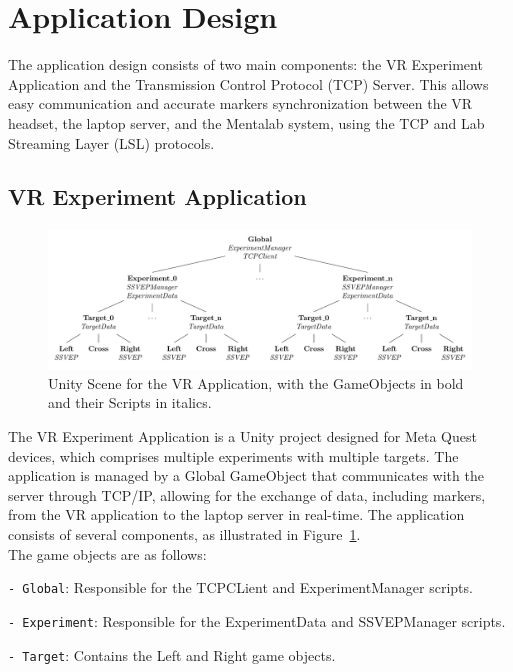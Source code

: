 \section{Application Design}

The application design consists of two main components: the VR Experiment Application and the Transmission Control Protocol (TCP) Server. This allows easy communication and accurate markers synchronization between the VR headset, the laptop server, and the Mentalab system, using the TCP and Lab Streaming Layer (LSL) protocols.

\subsection{VR Experiment Application}


\begin{figure}[b]
    \centering
    \includegraphics[width=\textwidth]{images/methods/hierarchy.pdf}
    \caption{Unity Scene for the VR Application, with the GameObjects in bold and their Scripts in italics.}\label{fig:unity-scene}
\end{figure}



The VR Experiment Application is a Unity project designed for Meta Quest devices, which comprises multiple experiments with multiple targets. The application is managed by a Global GameObject that communicates with the server through TCP/IP, allowing for the exchange of data, including markers, from the VR application to the laptop server in real-time. The application consists of several components, as illustrated in Figure~\ref{fig:unity-scene}. \\

The game objects are as follows:

\texttt{- Global}: Responsible for the TCPCLient and ExperimentManager scripts.

\texttt{- Experiment}: Responsible for the ExperimentData and SSVEPManager scripts.

\texttt{- Target}: Contains the Left and Right game objects.


